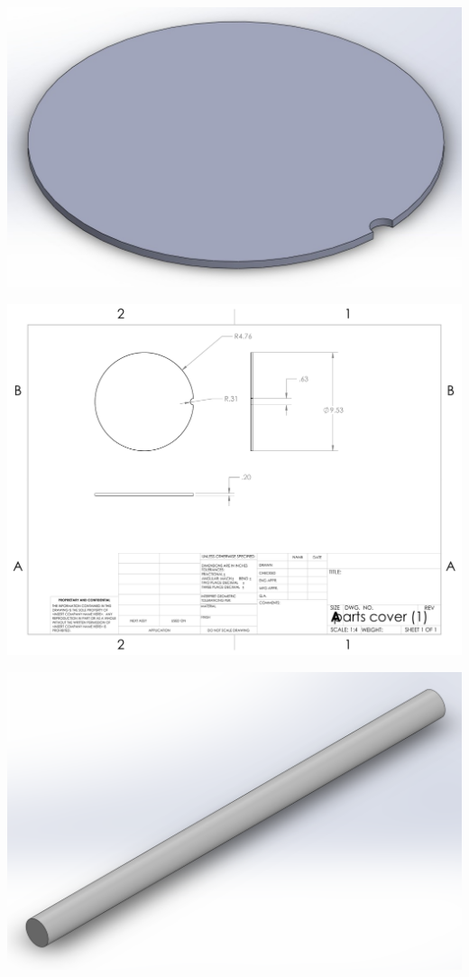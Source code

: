 \centering
\includegraphics[width=\linewidth]{root/Models/Parts_Cover.jpg}

\centering
\includegraphics[width=\linewidth]{root/Appendix_B/Parts_Cover.pdf}

\centering
\includegraphics[width=\linewidth]{root/Models/Dowel_Model.png}


